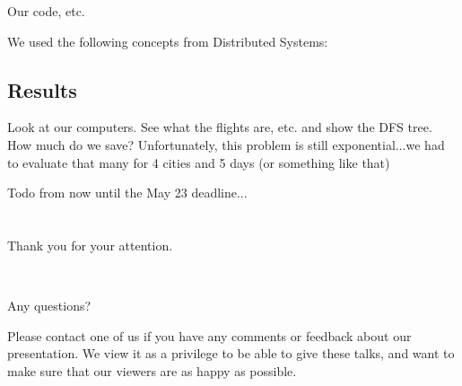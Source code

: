 \documentclass[10pt, xcolor=svgnames]{beamer}
\begin{document}
\begin{frame}
Our code, etc.
\end{frame}

\begin{frame}
We used the following concepts from Distributed Systems:
\end{frame}

\subsection{Results}

\begin{frame}
Look at our computers. See what the flights are, etc. and show the DFS tree. How much do we save?
Unfortunately, this problem is still exponential...we had to evaluate that many for 4 cities and 5 days (or something like that)
\end{frame}

\begin{frame}
Todo from now until the May 23 deadline...
\end{frame}




\section{}
\begin{frame}
\begin{center}
\Large{Thank you for your attention.}

~

\Huge{Any questions?\\}
\end{center}

\begin{center}
Please contact one of us if you have any comments or feedback about our presentation. We view it as a privilege to be able to give these talks, and
want to make sure that our viewers are as happy as possible.
\end{center}
\end{frame}
\end{document}
